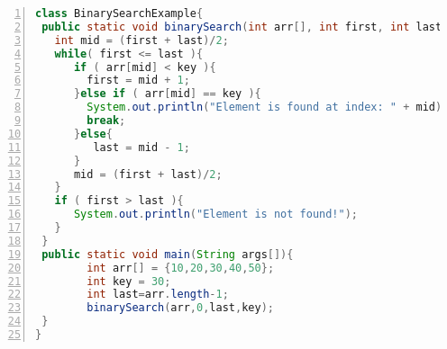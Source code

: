 \documentclass{article}
\begin{document}
\lstlistoflistings

\begin{lstlisting}[float=hb!,caption={Bináris keresés Javaban},
label=lst:buborek,language=java,tabsize=6,numbers=left,stepnumber=5,firstnumber=1, frame=leftline]
class BinarySearchExample{  
 public static void binarySearch(int arr[], int first, int last, int key){  
   int mid = (first + last)/2;  
   while( first <= last ){  
      if ( arr[mid] < key ){  
        first = mid + 1;     
      }else if ( arr[mid] == key ){  
        System.out.println("Element is found at index: " + mid);  
        break;  
      }else{  
         last = mid - 1;  
      }  
      mid = (first + last)/2;  
   }  
   if ( first > last ){  
      System.out.println("Element is not found!");  
   }  
 }  
 public static void main(String args[]){  
        int arr[] = {10,20,30,40,50};  
        int key = 30;  
        int last=arr.length-1;  
        binarySearch(arr,0,last,key);     
 }  
}  
\end{lstlisting}
\end{document}
